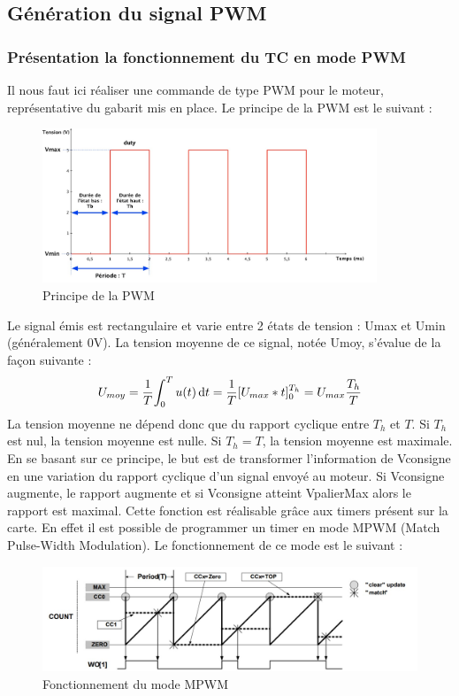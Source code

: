 \documentclass[a4paper]{article}
\begin{document}
\subsection{Génération du signal PWM}
	\subsubsection{Présentation la fonctionnement du TC en mode PWM}
	Il nous faut ici réaliser une commande de type PWM pour le moteur, représentative du gabarit mis en place. Le principe de la PWM est le suivant :  
	\begin{figure}[H]
	\centering
	\includegraphics[width=10cm]{CaracPWM.jpg}
	\caption{Principe de la PWM}
    \end{figure}
	Le  signal  émis  est  rectangulaire  et  varie  entre  2  états  de  tension :  Umax  et  Umin (généralement  0V). La  tension  moyenne  de  ce signal,  notée  Umoy,  s’évalue de  la  façon suivante :  
	\begin{equation}
		U_{moy} = {\frac 1T}{\int_0^T {u(t)} \,{\rm d}t} = {\frac 1T}{[U_{max}*t]_0^{T_{h}}} = {U_{max}}{\frac {T_{h}}T}
	\end{equation}
	La tension moyenne ne dépend donc que du rapport cyclique entre $T_{h}$ et $T$. Si $T_{h}$ est nul, la tension moyenne est nulle. Si $T_{h}=T$, la tension moyenne est maximale. \\
	En se basant sur ce principe, le but est de transformer l’information de Vconsigne en une variation du rapport cyclique d’un signal envoyé au moteur. Si Vconsigne augmente, le rapport augmente et si Vconsigne atteint VpalierMax alors le rapport est maximal. Cette fonction est réalisable  grâce aux timers présent sur la carte. En effet il est possible de programmer un timer en mode MPWM (Match Pulse-Width Modulation). Le fonctionnement de ce mode est le suivant :
	\begin{figure}[H]
	\centering
	\includegraphics[width=0.9\linewidth]{mode_MPWM.jpg}
	\caption{Fonctionnement du mode MPWM}
    \end{figure}
\end{document}
